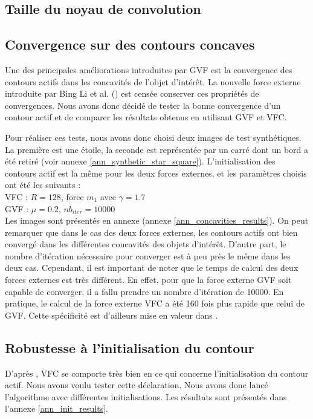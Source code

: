 \subsection{Taille du noyau de convolution}



\subsection{Convergence sur des contours concaves}
Une des principales améliorations introduites par GVF est la convergence des contours actifs dans les concavités de l'objet d'intérêt. La nouvelle force externe introduite par Bing Li et al. (\cite{vfc}) est censée conserver ces propriétés de convergences. Nous avons donc décidé de tester la bonne convergence d'un contour actif et de comparer les résultats obtenus en utilisant GVF et VFC.

Pour réaliser ces tests, nous avons donc choisi deux images de test synthétiques. La première est une étoile, la seconde est représentée par un carré dont un bord a été retiré (voir annexe \ref{ann_synthetic_star_square}). L'initialisation des contours actif est la même pour les deux forces externes, et les paramètres choisis ont été les suivants :\\

VFC : $R = 128$, force $m_{1}$ avec $\gamma = 1.7$\\
GVF : $\mu = 0.2$, $nb_{iter} = 10000$\\

Les images sont présentés en annexe (annexe  \ref{ann_concavities_results}). On peut remarquer que dans le cas des deux forces externes, les contours actifs ont bien convergé dans les différentes concavités des objets d'intérêt. D'autre part, le nombre d'itération nécessaire pour converger est à peu près le même dans les deux cas. Cependant, il est important de noter que le temps de calcul des deux forces externes est très différent. En effet, pour que la force externe GVF soit capable de converger, il a fallu prendre un nombre d'itération de 10000. En pratique, le calcul de la force externe VFC a été 160 fois plus rapide que celui de GVF. Cette spécificité est d'ailleurs mise en valeur dans \cite{vfc}. 

\subsection{Robustesse à l'initialisation du contour}
D'après \cite{vfc}, VFC se comporte très bien en ce qui concerne l'initialisation du contour actif. Nous avons voulu tester cette déclaration. Nous avons donc lancé l'algorithme avec différentes initialisations. Les résultats sont présentés dans l'annexe \ref{ann_init_results}.\\ 

